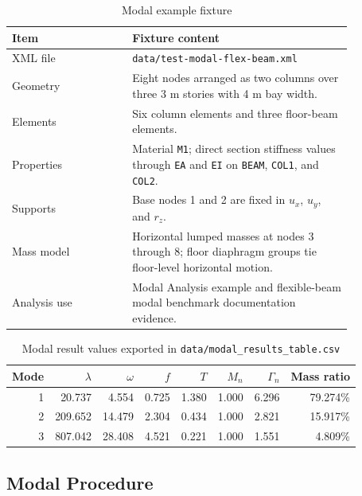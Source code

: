 \documentclass[11pt,a4paper]{article}
\begin{document}
\begin{table}[htbp]
\centering
\caption{Modal example fixture}
\begin{tabular}{p{0.30\linewidth}p{0.55\linewidth}}
\toprule
Item & Fixture content \\
\midrule
XML file & \texttt{data/test-modal-flex-beam.xml} \\
Geometry & Eight nodes arranged as two columns over three 3 m stories with 4 m bay width. \\
Elements & Six column elements and three floor-beam elements. \\
Properties & Material \texttt{M1}; direct section stiffness values through \texttt{EA} and \texttt{EI} on \texttt{BEAM}, \texttt{COL1}, and \texttt{COL2}. \\
Supports & Base nodes 1 and 2 are fixed in \(u_x\), \(u_y\), and \(r_z\). \\
Mass model & Horizontal lumped masses at nodes 3 through 8; floor diaphragm groups tie floor-level horizontal motion. \\
Analysis use & Modal Analysis example and flexible-beam modal benchmark documentation evidence. \\
\bottomrule
\end{tabular}
\end{table}

\begin{table}[htbp]
\centering
\caption{Modal result values exported in \texttt{data/modal\_results\_table.csv}}
\begin{tabular}{rrrrrrrr}
\toprule
Mode & \(\lambda\) & \(\omega\) & \(f\) & \(T\) & \(M_n\) & \(\Gamma_n\) & Mass ratio \\
\midrule
1 & 20.737 & 4.554 & 0.725 & 1.380 & 1.000 & 6.296 & 79.274\% \\
2 & 209.652 & 14.479 & 2.304 & 0.434 & 1.000 & 2.821 & 15.917\% \\
3 & 807.042 & 28.408 & 4.521 & 0.221 & 1.000 & 1.551 & 4.809\% \\
\bottomrule
\end{tabular}
\end{table}

\subsection{Modal Procedure}
\end{document}
